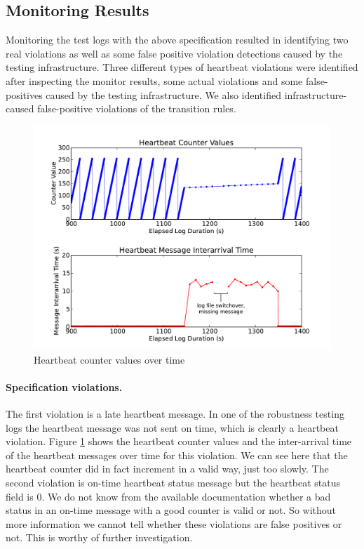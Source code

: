 
\subsection{Monitoring Results}
Monitoring the test logs with the above specification resulted in identifying two real violations as well as some false positive violation detections caused by the testing infrastructure.
%
Three different types of heartbeat violations were identified after inspecting the monitor results, some actual violations and some false-positives caused by the testing infrastructure. We also identified infrastructure-caused false-positive violations of the transition rules.

\begin{figure}[t]
		\includegraphics[width=4.5in]{img/hb1}
		\caption{Heartbeat counter values over time}
		\label{fig:hb_arrival}
\end{figure}

\paragraph{Specification violations.}
The first violation is a late heartbeat message. In one of the robustness testing logs the heartbeat message was not sent on time, which is clearly a heartbeat violation. Figure \ref{fig:hb_arrival} shows the heartbeat counter values and the inter-arrival time of the heartbeat messages over time for this violation. We can see here that the heartbeat counter did in fact increment in a valid way, just too slowly. 
The second violation is on-time heartbeat status message but the heartbeat status field is 0. 
We do not know from the available documentation whether a bad status in an on-time message with a good counter is valid or not. So without more information we cannot tell whether these violations are false positives or not. This is worthy of further investigation.


